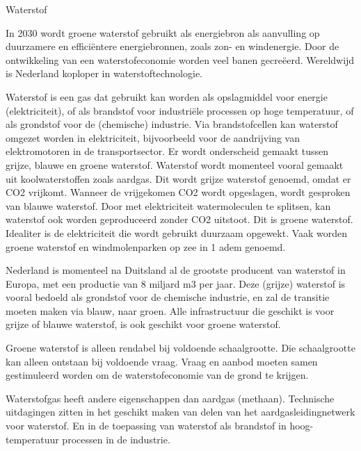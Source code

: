\begin{voorstel}{Waterstof}

\begin{samenvatting}
In 2030 wordt groene waterstof gebruikt als energiebron als aanvulling op duurzamere en efficiëntere energiebronnen, zoals zon- en windenergie. Door de ontwikkeling van een waterstofeconomie worden veel banen gecreëerd. Wereldwijd is Nederland koploper in waterstoftechnologie.
\end{samenvatting}

\begin{uitdaging}
Waterstof is een gas dat gebruikt kan worden als opslagmiddel voor energie (elektriciteit), of als brandstof voor industriële processen op hoge temperatuur, of als grondstof voor de (chemische) industrie. Via brandstofcellen kan waterstof omgezet worden in elektriciteit, bijvoorbeeld voor de aandrijving van elektromotoren in de transportsector. 
Er wordt onderscheid gemaakt tussen grijze, blauwe en groene waterstof. Waterstof wordt momenteel vooral gemaakt uit koolwaterstoffen zoals aardgas. Dit wordt grijze waterstof genoemd, omdat er  CO2 vrijkomt. Wanneer de vrijgekomen CO2 wordt opgeslagen, wordt gesproken van blauwe waterstof. Door met elektriciteit watermoleculen te splitsen, kan waterstof ook worden geproduceerd zonder CO2 uitstoot. Dit is groene waterstof. Idealiter is de elektriciteit die wordt gebruikt duurzaam opgewekt. Vaak worden groene waterstof en windmolenparken op zee in 1 adem genoemd.

Nederland is momenteel na Duitsland al de grootste producent van waterstof in Europa, met een productie van 8 miljard m3 per jaar. Deze (grijze) waterstof is vooral bedoeld als grondstof voor de chemische industrie, en zal de transitie moeten maken via blauw, naar groen. Alle infrastructuur die geschikt is voor grijze of blauwe waterstof, is ook geschikt voor groene waterstof.

Groene waterstof is alleen rendabel bij voldoende schaalgrootte. Die schaalgrootte kan alleen ontstaan bij voldoende vraag. Vraag en aanbod moeten samen gestimuleerd worden om de waterstofeconomie van de grond te krijgen.

Waterstofgas heeft andere eigenschappen dan aardgas (methaan). Technische uitdagingen zitten in het geschikt maken van delen van het aardgasleidingnetwerk voor waterstof. En in de toepassing van waterstof als brandstof in hoog-temperatuur processen in de industrie.
\end{uitdaging}


\end{voorstel}

